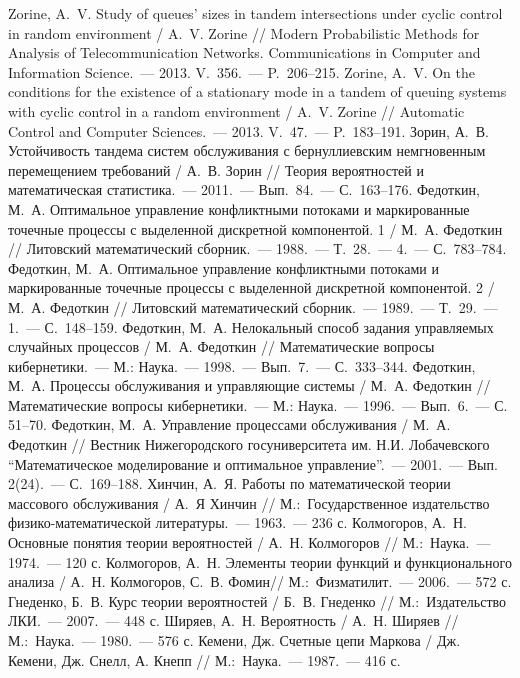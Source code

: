 \documentclass[a4paper,12pt,russian]{extarticle}
\newcommand{\No}{\textnumero}
\begin{document}
\begin{thebibliography}{99}
 Zorine, A.~V. Study of queues’ sizes in tandem intersections under cyclic control in random environment /  A.~V. Zorine // Modern Probabilistic Methods for Analysis of Telecommunication Networks. Communications in Computer and Information Science.~--- 2013. V.~356.~--- P.~206--215.
 Zorine, A.~V. On the conditions for the existence of a stationary mode in a tandem of queuing systems with cyclic control in a random environment / A.~V. Zorine // Automatic Control and Computer Sciences.~--- 2013. V.~47.~--- P.~183--191.
 Зорин, А.~В. Устойчивость тандема систем обслуживания с бернуллиевским немгновенным перемещением требований / А.~В. Зорин // Теория вероятностей и математическая статистика.~--- 2011.~--- Вып.~84.~--- С.~163--176.
 Федоткин, М.~А. Оптимальное управление конфликтными потоками и маркированные точечные процессы с выделенной дискретной компонентой. 1 / М.~А. Федоткин // Литовский математический сборник.~--- 1988.~--- Т.~28.~--- \No {} 4.~--- С.~783--784.
 Федоткин, М.~А. Оптимальное управление конфликтными потоками и маркированные точечные процессы с выделенной дискретной компонентой. 2 / М.~А. Федоткин // Литовский математический сборник.~--- 1989.~--- Т.~29.~--- \No {} 1.~--- С.~148--159.
 Федоткин, М.~А. Нелокальный способ задания управляемых случайных процессов / М.~А. Федоткин // Математические вопросы кибернетики.~--- М.: Наука.~--- 1998.~--- Вып.~7.~--- С.~333--344.
 Федоткин, М.~А. Процессы обслуживания и управляющие системы / М.~А. Федоткин // Математические вопросы кибернетики.~--- М.: Наука.~--- 1996.~--- Вып.~6.~--- С. 51--70.
 Федоткин, М.~А. Управление процессами обслуживания / М.~А. Федоткин // Вестник Нижегородского госуниверситета им. Н.И. Лобачевского “Математическое моделирование и оптимальное управление”.~--- 2001.~--- Вып. 2(24).~--- С.~169--188.
 Хинчин, А.~Я. Работы по математической теории массового обслуживания / А.~Я Хинчин // М.:~Государственное издательство физико-математической литературы.~--- 1963.~--- 236 с.
 Колмогоров, А.~Н. Основные понятия теории вероятностей / А.~Н. Колмогоров // М.:~Наука.~--- 1974.~--- 120 с.
 Колмогоров, А.~Н. Элементы теории функций и функционального анализа / А.~Н. Колмогоров, С.~В. Фомин// М.:~Физматилит.~--- 2006.~--- 572 с.
 Гнеденко, Б.~В. Курс теории вероятностей / Б.~В. Гнеденко // М.:~Издательство ЛКИ.~--- 2007.~--- 448 с.
 Ширяев, А.~Н. Вероятность / А.~Н. Ширяев // М.:~Наука.~--- 1980.~--- 576 с.
 Кемени, Дж. Счетные цепи Маркова / Дж. Кемени, Дж. Снелл, А. Кнепп // М.:~Наука.~--- 1987.~--- 416 с.
\end{thebibliography}
\end{document}
